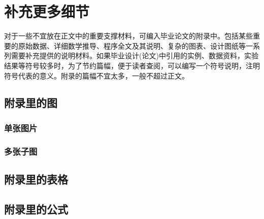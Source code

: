 \chapter{补充更多细节}\label{chapter:append1}
对于一些不宜放在正文中的重要支撑材料，可编入毕业论文的附录中。包括某些重要的原始数据、详细数学推导、程序全文及其说明、复杂的图表、设计图纸等一系列需要补充提供的说明材料。如果毕业设计(论文)中引用的实例、数据资料，实验结果等符号较多时，为了节约篇幅，便于读者查阅，可以编写一个符号说明，注明符号代表的意义。附录的篇幅不宜太多，一般不超过正文。

\section{附录里的图}

\subsection{单张图片}
\subsection{多张子图}

\section{附录里的表格}

\section{附录里的公式}


\endinput
